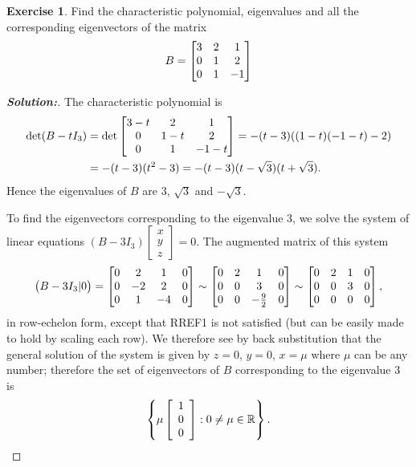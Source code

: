 \documentclass[a4paper]{amsart}
\theoremstyle{definition}
\newtheorem{exercise}{Exercise}
\newenvironment{solution}{\begin{proof}[\textbf{Solution:}] \vphantom{u}}{\end{proof}}
\begin{document}
\begin{exercise}\label{ex-evectors-ii}
 Find the characteristic polynomial, eigenvalues and all the corresponding
 eigenvectors of the matrix
 \[ B = \left[\begin{matrix} 3 & 2 & 1 \\ 0 & 1 & 2 \\ 0 & 1 & -1 \end{matrix}\right] \]
\end{exercise}
\begin{solution}
 The characteristic polynomial is
    \begin{align*} \det (B - tI_3) & =
    \det \left[\begin{matrix}
    3-t & 2 & 1 \\
 0 & 1-t & 2 \\
 0 & 1 & -1-t
    \end{matrix}\right]=-(t-3)((1-t)(-1-t) - 2)\\ & = -(t-3)(t^2-3)
    = -(t-3)(t - \sqrt{3})(t+\sqrt{3}).
    \end{align*}
 Hence the eigenvalues of $B$ are $3$, $\sqrt{3}$ and $-\sqrt{3}$.

 To find the eigenvectors corresponding to the eigenvalue $3$, we
 solve the system of linear equations $(B - 3I_3)\left[
 \begin{array}{c}x \\ y\\z
 \end{array} \right] = 0$. The augmented matrix of this system
 \[
 \big(B - 3I_3|0\big) = \left[\begin{matrix} 0& 2&
 1&0\\0&-2&2&0\\0&1&-4&0\end{matrix}\right] \sim \left[\begin{matrix} 0& 2&
 1&0\\0&0&3&0\\0&0&-\frac{9}{2}&0\end{matrix}\right] \sim \left[\begin{matrix}
 0& 2& 1&0\\0&0&3&0\\0&0&0&0\end{matrix}\right],
 \]
 in row-echelon form, except that RREF1 is not satisfied (but
 can be easily made to hold by scaling each row).
 We therefore see by back substitution that
 the general solution of the system is given by $z = 0$, $y = 0$,
 $x = \mu$ where $\mu$ can be any number; therefore the set of
 eigenvectors of $B$ corresponding to the eigenvalue $3$ is
 \[
 \left\{ \mu \left[ \begin{array}{c} 1\\0\\0
 \end{array} \right] : 0 \neq \mu \in {\mathbb{R}} \right\}.
 \]


\end{solution}
\end{document}
